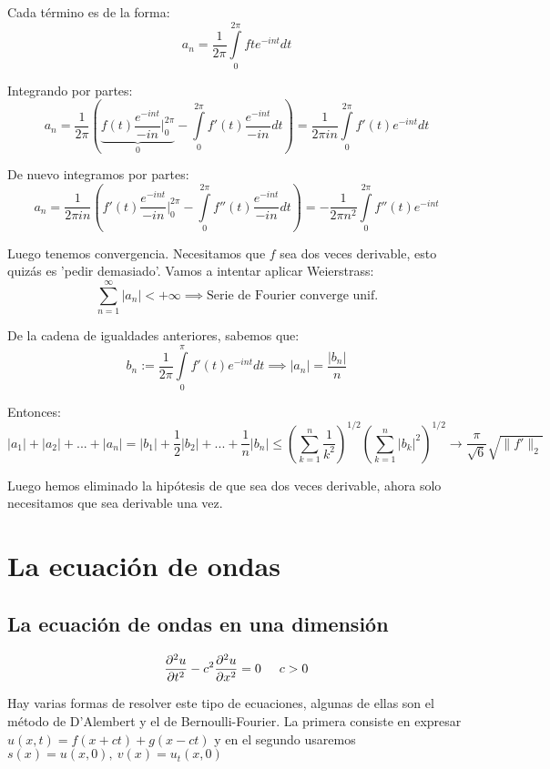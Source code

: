 \documentclass[openany]{book}
\begin{document}
\begin{demonstration}
  Cada término es de la forma:
  $$ a_n = \dfrac{1}{2\pi} \int\limits_{0}^{2\pi} fte^{-int}dt $$

  Integrando por partes:
  $$ a_n = \dfrac{1}{2\pi} \left( \underbrace{f(t)\dfrac{e^{-int}}{-in}\Biggr|_{0}^{2\pi} }_{0} - \int\limits_{0}^{2\pi}f'(t) \dfrac{e^{-int}}{-in}dt\right) = \dfrac{1}{2\pi i n} \int\limits_{0}^{2\pi}f'(t)e^{-int}dt  $$

  De nuevo integramos por partes:
  $$ a_n = \dfrac{1}{2\pi i n} \left( f'(t) \dfrac{e^{-int}}{-in} \Biggr|_{0}^{2\pi} - \int\limits_{0}^{2\pi}f''(t)\dfrac{e^{-int}}{-in}dt \right) = -\dfrac{1}{2\pi n^2} \int\limits_{0}^{2\pi}f''(t) e^{-int} $$

  Luego tenemos convergencia. Necesitamos que $ f $ sea dos veces derivable, esto quizás es 'pedir demasiado'. Vamos a intentar aplicar Weierstrass:
  $$ \sum\limits_{n=1}^{\infty} |a_n| < +\infty \implies \text{Serie de Fourier converge unif.} $$

  De la cadena de igualdades anteriores, sabemos que:
  $$ b_n := \dfrac{1}{2\pi} \int\limits_{0}^{\pi}f'(t)e^{-int}dt \implies |a_n| = \dfrac{|b_n|}{n} $$

  Entonces:
  $$ |a_1|+|a_2|+...+|a_n| = |b_1|+\dfrac{1}{2}|b_2|+...+\dfrac{1}{n}|b_n| \leq  \left( \sum\limits_{k=1}^{n} \dfrac{1}{k^2} \right) ^{1/2} \left( \sum\limits_{k=1}^{n} |b_k|^2 \right)^{1/2} \to \dfrac{\pi}{\sqrt{6}}\sqrt{\|f'\|_{2}} $$

  Luego hemos eliminado la hipótesis de que sea dos veces derivable, ahora solo necesitamos que sea derivable una vez.

  

\end{demonstration}


\chapter{La ecuación de ondas}

\section{La ecuación de ondas en una dimensión}

$$ \dfrac{\partial ^2 u}{\partial t^2}- c^2 \dfrac{\partial ^2 u}{\partial x ^2} = 0 \hspace{5mm} c>0 $$

Hay varias formas de resolver este tipo de ecuaciones, algunas de ellas son el método de D'Alembert y el de Bernoulli-Fourier. La primera consiste en expresar $ u(x,t) = f(x+ct) + g(x-ct) $ y en el segundo usaremos $ s(x) = u(x,0),\ v(x)=u_{t}(x,0) $
\end{document}
